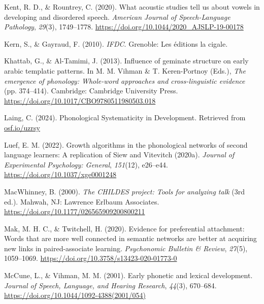 \documentclass[
  man]{apa6}
\newlength{\cslhangindent}
\newlength{\cslentryspacingunit} %
\newenvironment{CSLReferences}[2] %
 {%
  \setlength{\parindent}{0pt}
  \ifodd #1
  \let\oldpar\par
  \def\par{\hangindent=\cslhangindent\oldpar}
  \fi
  \setlength{\parskip}{#2\cslentryspacingunit}
 }%
 {}
\begin{document}
\begin{CSLReferences}{1}{0}
\leavevmode{}%
Kent, R. D., \& Rountrey, C. (2020). What acoustic studies tell us about vowels in developing and disordered speech. \emph{American Journal of Speech-Language Pathology}, \emph{29}(3), 1749--1778. \url{https://doi.org/10.1044/2020_AJSLP-19-00178}

\leavevmode{}%
Kern, S., \& Gayraud, F. (2010). \emph{{IFDC}}. Grenoble: Les éditions la cigale.

\leavevmode{}%
Khattab, G., \& Al-Tamimi, J. (2013). Influence of geminate structure on early arabic templatic patterns. In M. M. Vihman \& T. Keren-Portnoy (Eds.), \emph{The emergence of phonology: Whole-word approaches and cross-linguistic evidence} (pp. 374--414). Cambridge: Cambridge University Press. \url{https://doi.org/10.1017/CBO9780511980503.018}

\leavevmode{}%
Laing, C. (2024). Phonological {Systematicity} in {Development}. Retrieved from \href{https://osf.io/uzrsy}{osf.io/uzrsy}

\leavevmode{}%
Luef, E. M. (2022). Growth algorithms in the phonological networks of second language learners: {A} replication of {Siew} and {Vitevitch} (2020a). \emph{Journal of Experimental Psychology: General}, \emph{151}(12), e26--e44. \url{https://doi.org/10.1037/xge0001248}

\leavevmode{}%
MacWhinney, B. (2000). \emph{The {CHILDES} project: Tools for analyzing talk} (3rd ed.). Mahwah, {NJ}: Lawrence Erlbaum Associates. \url{https://doi.org/10.1177/026565909200800211}

\leavevmode{}%
Mak, M. H. C., \& Twitchell, H. (2020). Evidence for preferential attachment: Words that are more well connected in semantic networks are better at acquiring new links in paired-associate learning. \emph{Psychonomic Bulletin \& Review}, \emph{27}(5), 1059--1069. \url{https://doi.org/10.3758/s13423-020-01773-0}

\leavevmode{}%
McCune, L., \& Vihman, M. M. (2001). Early phonetic and lexical development. \emph{Journal of Speech, Language, and Hearing Research}, \emph{44}(3), 670--684. \url{https://doi.org/10.1044/1092-4388(2001/054)}


\end{CSLReferences}
\end{document}
